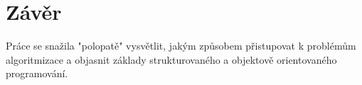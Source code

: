 \chapter{Závěr}
Práce se snažila "polopatě" vysvětlit, jakým způsobem přistupovat k problémům algoritmizace a objasnit základy strukturovaného a objektově orientovaného programování.